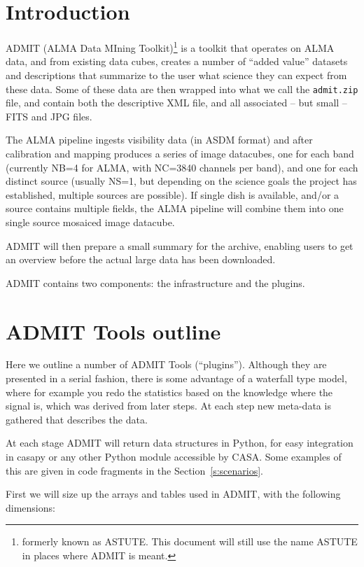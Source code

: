 \documentclass[preprint]{aastex} %
\begin{document}
\section{Introduction}

ADMIT (ALMA Data MIning Toolkit)\footnote{formerly known as ASTUTE. 
This document will still use the name ASTUTE in places where ADMIT is meant.}
is a toolkit that operates on ALMA data, and from existing data cubes, 
creates a number of ``added value'' datasets and descriptions 
that summarize to the user
what science they can expect from these data. Some of these data
are then wrapped into what
we call the {\tt admit.zip} file, and contain both the descriptive XML
file, and all associated -- but small -- FITS and JPG files.

The ALMA pipeline ingests visibility data (in ASDM format) and after calibration
and mapping produces a series of image datacubes, one for each band (currently 
NB=4 for ALMA, with NC=3840 channels per band), and one for each distinct
source (usually NS=1, but depending on the science 
goals the project has established, multiple sources are possible). If
single dish is available, and/or a source contains multiple fields,
the ALMA pipeline will combine them into one single source 
mosaiced image datacube.

ADMIT will then prepare a small summary for the archive, enabling users
to get an overview before the actual large data has been downloaded.

ADMIT contains two components: the infrastructure and the plugins.


\section{ADMIT Tools outline}

\label{s:tools}

Here we outline a number of ADMIT Tools (``plugins'').  Although they
are presented in a serial fashion, there is some advantage of a
waterfall type model, where for example you redo the statistics based
on the knowledge where the signal is, which was derived from later steps. At
each step new meta-data is gathered that describes the data.

At each stage ADMIT will return data structures in Python, for easy
integration in casapy or any other Python module accessible by
CASA. Some examples of this are given in code fragments in the 
Section~\ref{s:scenarios}.

First we will size up the arrays and tables used in ADMIT, with the 
following dimensions:
\end{document}
